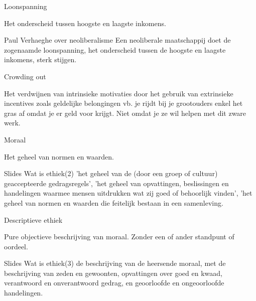 \documentclass[main.tex]{subfiles}
\begin{document}
\begin{examenvraag}
    \begin{vraag}
        Loonspanning
    \end{vraag}

    \begin{antwoord}
        Het onderscheid tussen hoogste en laagste inkomens.
        \begin{citaat}{Paul Verhaeghe over neoliberalisme}
            Een neoliberale maatschappij doet de zogenaamde loonspanning, het onderscheid tussen de hoogste en laagste inkomens, sterk stijgen.
        \end{citaat}
    \end{antwoord}
\end{examenvraag}


\begin{examenvraag}
    \begin{vraag}
        Crowding out
    \end{vraag}

    \begin{antwoord}
	Het verdwijnen van intrinsieke motivaties door het gebruik van extrinsieke incentives zoals 
	geldelijke belongingen vb.‭ ‬je rijdt bij je grootouders enkel het gras af omdat je er geld voor 
	krijgt.‭ ‬Niet omdat je ze wil helpen met dit zware werk.
    \end{antwoord}
\end{examenvraag}


\begin{examenvraag}
    \begin{vraag}
        Moraal
    \end{vraag}

    \begin{antwoord}
    	Het geheel van normen en waarden. 
		\begin{citaat}{Slides Wat is ethiek(2)}
			'het geheel van de (door een groep of cultuur) geaccepteerde gedragsregels', 
			'het geheel van opvattingen, beslissingen en handelingen waarmee mensen uitdrukken wat zij goed of behoorlijk vinden',
			'het geheel van normen en waarden die feitelijk bestaan in een samenleving.
		\end{citaat}
    \end{antwoord}
\end{examenvraag}


\begin{examenvraag}
    \begin{vraag}
        Descriptieve ethiek
    \end{vraag}

    \begin{antwoord}
    	Pure objectieve beschrijving van moraal.
    	Zonder een of ander standpunt of oordeel. 
		\begin{citaat}{Slides Wat is ethiek(3)}
			de beschrijving van de heersende moraal, met de beschrijving van zeden en gewoonten, opvattingen over goed en kwaad,
			verantwoord en onverantwoord gedrag, en geoorloofde en ongeoorloofde handelingen.
		\end{citaat}
    \end{antwoord}
\end{examenvraag}
\end{document}
